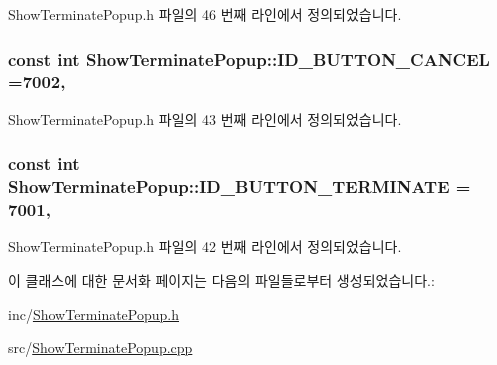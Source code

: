 Show\+Terminate\+Popup.\+h 파일의 46 번째 라인에서 정의되었습니다.

\hypertarget{class_show_terminate_popup_adc8e53a742deffcc1f19877af899b519}{
\subsubsection[{I\+D\+\_\+\+B\+U\+T\+T\+O\+N\+\_\+\+C\+A\+N\+C\+E\+L}]{\setlength{\rightskip}{0pt plus 5cm}const int Show\+Terminate\+Popup\+::\+I\+D\+\_\+\+B\+U\+T\+T\+O\+N\+\_\+\+C\+A\+N\+C\+E\+L =7002\hspace{0.3cm}{\ttfamily [static]}, {\ttfamily [private]}}}\label{class_show_terminate_popup_adc8e53a742deffcc1f19877af899b519}


Show\+Terminate\+Popup.\+h 파일의 43 번째 라인에서 정의되었습니다.

\hypertarget{class_show_terminate_popup_a3d752f28b25045ca82b99204b0162d79}{
\subsubsection[{I\+D\+\_\+\+B\+U\+T\+T\+O\+N\+\_\+\+T\+E\+R\+M\+I\+N\+A\+T\+E}]{\setlength{\rightskip}{0pt plus 5cm}const int Show\+Terminate\+Popup\+::\+I\+D\+\_\+\+B\+U\+T\+T\+O\+N\+\_\+\+T\+E\+R\+M\+I\+N\+A\+T\+E = 7001\hspace{0.3cm}{\ttfamily [static]}, {\ttfamily [private]}}}\label{class_show_terminate_popup_a3d752f28b25045ca82b99204b0162d79}


Show\+Terminate\+Popup.\+h 파일의 42 번째 라인에서 정의되었습니다.



이 클래스에 대한 문서화 페이지는 다음의 파일들로부터 생성되었습니다.\+:\begin{DoxyCompactItemize}
\item 
inc/\hyperlink{_show_terminate_popup_8h}{Show\+Terminate\+Popup.\+h}\item 
src/\hyperlink{_show_terminate_popup_8cpp}{Show\+Terminate\+Popup.\+cpp}\end{DoxyCompactItemize}
